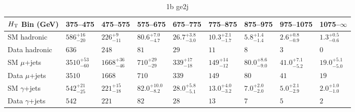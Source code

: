 \documentclass[8pt]{article}
\def\scalht{\mbox{$H_{\rm{T}}$}\xspace}
\newcommand\T{\rule{0pt}{2.6ex}}
\newcommand\B{\rule[-1.2ex]{0pt}{0pt}}
\begin{document}
\begin{table}[ht!]
\caption{1b ge2j}
\label{tab:ensemble-1b ge2j}
\centering
\begin{tabular}{ lllllllll }

\hline
\scalht Bin (GeV)       & 375--475                       & 475--575                       & 575--675                       & 675--775                       & 775--875                       & 875--975                       & 975--1075                      & 1075--$\infty$                 \\ [1.000000ex]
\hline
SM hadronic\T           & $586^{+16}_{-20}$              & $226^{+9}_{-11}$               & $80.6^{+7.0}_{-4.7}$           & $26.7^{+3.8}_{-3.0}$           & $10.3^{+2.1}_{-1.7}$           & $5.8^{+1.4}_{-1.4}$            & $2.6^{+0.8}_{-0.9}$            & $1.3^{+0.5}_{-0.6}$            \\ 
Data hadronic\B         & $636$                          & $248$                          & $81$                           & $29$                           & $11$                           & $8$                            & $3$                            & $0$                            \\ 
\hline
SM $\mu$+jets\T         & $3510^{+53}_{-60}$             & $1668^{+36}_{-46}$             & $710^{+29}_{-29}$              & $339^{+17}_{-18}$              & $149^{+14}_{-12}$              & $80.0^{+8.6}_{-9.0}$           & $41.0^{+7.1}_{-5.2}$           & $19.0^{+5.1}_{-5.0}$           \\ 
Data $\mu$+jets\B       & $3510$                         & $1668$                         & $710$                          & $339$                          & $149$                          & $80$                           & $41$                           & $19$                           \\ 
\hline
SM $\gamma$+jets\T      & $542^{+21}_{-25}$              & $221^{+15}_{-18}$              & $82.0^{+10.0}_{-8.2}$          & $28.0^{+5.8}_{-5.1}$           & $13.0^{+4.0}_{-3.2}$           & $7.0^{+2.0}_{-2.0}$            & $5.0^{+2.1}_{-2.9}$            & $2.0^{+1.0}_{-1.0}$            \\ 
Data $\gamma$+jets\B    & $542$                          & $221$                          & $82$                           & $28$                           & $13$                           & $7$                            & $5$                            & $2$                            \\ 
\hline

\end{tabular}
\end{table}
\end{document}
